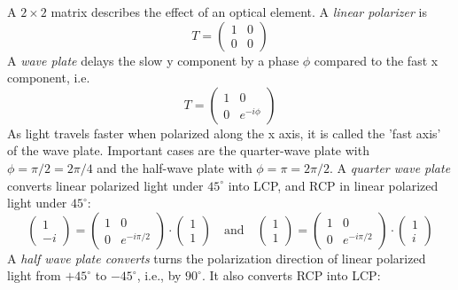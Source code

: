 A $2 \times 2$ matrix describes the effect of an optical element. A \emph{linear polarizer} is
\begin{equation}
    T = 
    \begin{pmatrix}
   1 & 0 \\ 0 & 0
    \end{pmatrix} 
\end{equation}
A \emph{wave plate} delays the slow y component by a phase $\phi$ compared to the fast x component, i.e.
\begin{equation}
    T = 
    \begin{pmatrix}
   1 & 0 \\ 0 & e^{-i \phi}
    \end{pmatrix} 
\end{equation}
As light travels faster when polarized along the x axis, it is called the 'fast axis' of the wave plate.
Important cases are the quarter-wave plate with $\phi = \pi/2 = 2 \pi / 4$ and the half-wave plate with  $\phi = \pi = 2 \pi / 2$. A \emph{quarter wave plate} converts linear polarized light under $45^\circ $ into LCP, and RCP in linear polarized light under $45^\circ$:
\begin{equation}
    \begin{pmatrix}
        1 \\ -i
     \end{pmatrix}
     = 
    \begin{pmatrix}
        1 & 0 \\ 0 & e^{-i \pi/2}
         \end{pmatrix} \cdot
         \begin{pmatrix}
            1 \\ 1
         \end{pmatrix}
         \quad \text{and} \quad
         \begin{pmatrix}
            1 \\ 1
         \end{pmatrix}
         = 
        \begin{pmatrix}
            1 & 0 \\ 0 & e^{-i \pi/2}
             \end{pmatrix} \cdot
             \begin{pmatrix}
                1 \\ i
             \end{pmatrix}
\end{equation}
A \emph{half wave plate converts} turns the polarization direction of
linear polarized light from $+45^\circ $ to $-45^\circ $, i.e., by $90^\circ$. It also converts RCP into LCP:
